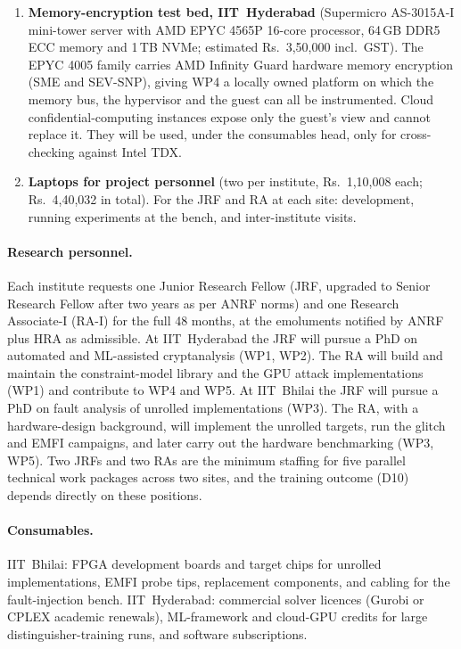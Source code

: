 \begin{enumerate}[label=\textbf{E\arabic*.}, leftmargin=*, itemsep=1pt]
  \item \textbf{Memory-encryption test bed, IIT~Hyderabad} (Supermicro AS-3015A-I mini-tower server with AMD EPYC 4565P 16-core processor, 64\,GB DDR5 ECC memory and 1\,TB NVMe; estimated Rs.~3,50,000 incl.\ GST).
        The EPYC 4005 family carries AMD Infinity Guard hardware memory encryption (SME and SEV-SNP), giving WP4 a locally owned platform on which the memory bus, the hypervisor and the guest can all be instrumented.
Cloud confidential-computing instances expose only the guest's view and cannot replace it. They will be used, under the consumables head, only for cross-checking against Intel TDX.
  \item \textbf{Laptops for project personnel} (two per institute, Rs.~1,10,008 each; Rs.~4,40,032 in total).
        For the JRF and RA at each site: development, running experiments at the bench, and inter-institute visits.
\end{enumerate}

\paragraph{Research personnel.}
Each institute requests one Junior Research Fellow (JRF, upgraded to Senior Research Fellow after two years as per ANRF norms) and one Research Associate-I (RA-I) for the full 48 months, at the emoluments notified by ANRF plus HRA as admissible.
At IIT~Hyderabad the JRF will pursue a PhD on automated and ML-assisted cryptanalysis (WP1, WP2).
The RA will build and maintain the constraint-model library and the GPU attack implementations (WP1) and contribute to WP4 and WP5.
At IIT~Bhilai the JRF will pursue a PhD on fault analysis of unrolled implementations (WP3).
The RA, with a hardware-design background, will implement the unrolled targets, run the glitch and EMFI campaigns, and later carry out the  hardware benchmarking (WP3, WP5).
Two JRFs and two RAs are the minimum staffing for five parallel technical work packages across two sites, and the training outcome (D10) depends directly on these positions.


\paragraph{Consumables.}
IIT~Bhilai: FPGA development boards and target chips for unrolled implementations, EMFI probe tips, replacement components, and cabling for the fault-injection bench.
IIT~Hyderabad: commercial solver licences (Gurobi or CPLEX academic renewals), ML-framework and cloud-GPU credits for large distinguisher-training runs, and software subscriptions.

